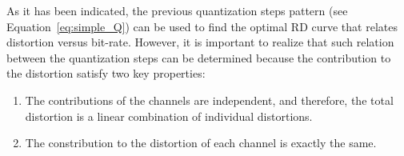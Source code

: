 As it has been indicated, the previous quantization steps pattern (see
Equation~\ref{eq:simple_Q}) can be used to find the optimal RD curve
that relates distortion versus bit-rate. However, it is important to
realize that such relation between the quantization steps can be
determined because the contribution to the distortion satisfy two key
properties:
\begin{enumerate}
\item The contributions of the channels are independent, and
  therefore, the total distortion is a linear combination of
  individual distortions.
\item The constribution to the distortion of each channel is exactly
  the same.
\end{enumerate}

\begin{comment}
Thus, the optimal QSs should
operate in the curves with the same RD slope,
\begin{equation}
  \lambda_{\text{R}} = \lambda_{\text{G}} = \lambda_{\text{B}},
  \label{eq:optimal_quantization}
\end{equation}
for a given total bit-rate $R$, which implies that the contribution of
each channel (the ratio between quality and bit-rate) to the quality
of $\tilde{x}$ has been highest
possible~\cite{vetterli1995wavelets,sayood2017introduction}.

Unfortunately, the previous procedure implies the computation of the
RD curve for each channel, which is a time-consuming operation. For
this reason, and supposing that the statistics of each channel are
similar and therefore, each channel is going to generate a RD curve
with the same slopes for the same QSs, we can suppose that
Eq.~\ref{eq:simple_Q} satisfies Eq.~\ref{eq:optimal_quantization}.
\end{comment}

